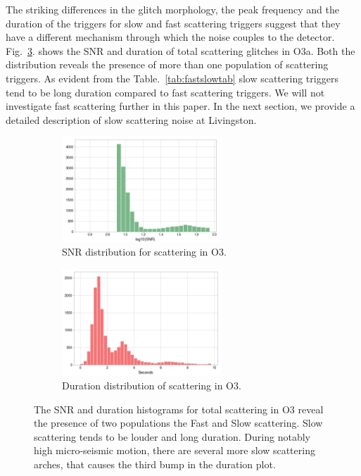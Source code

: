 \documentclass[12pt]{iopart}
\begin{document}
The striking differences in the glitch morphology, the peak frequency and the duration of the triggers for slow and fast scattering triggers suggest that they have a different mechanism through which the noise couples to the detector. Fig.~\ref{fig:snrdur}. shows the SNR and duration of total scattering glitches in O3a. Both the distribution reveals the presence of more than one population of scattering triggers. As evident from the Table.~\ref{tab:fastslowtab} slow scattering triggers tend to be long duration compared to fast scattering triggers. We will not investigate fast scattering further in this paper. In the next section, we provide a detailed description of slow scattering noise at Livingston.
\begin{figure}[h]
   \centering
    \begin{subfigure}[b]{0.45\textwidth}
        \centering
         \includegraphics[width= 6cm]{histsnr3.eps}
         \caption{SNR distribution for scattering in O3.}
         \label{fig:histsnr}
    \end{subfigure}
    \hfill
    \begin{subfigure}[b]{0.5\textwidth}
        \centering
         \includegraphics[width =6cm]{histdur3.eps}
         \caption{{\small Duration distribution of scattering in O3.}}
         \label{fig:histdur}
         
    
    \end{subfigure}
    \caption{The SNR and duration histograms for total scattering in O3 reveal the presence of two populations the Fast and Slow scattering. Slow scattering tends to be louder and long duration. During notably high micro-seismic motion, there are several more slow scattering arches, that causes the third bump in the duration plot.}
    \label{fig:snrdur}
    
\end{figure}
\end{document}
